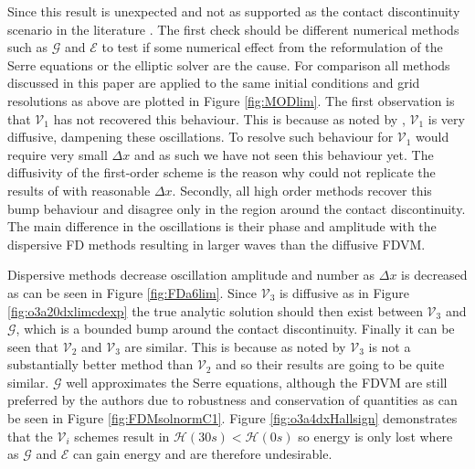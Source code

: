 \documentclass[SingleSpace,12pt,Journal]{Serre_ASCE}
\begin{document}
Since this result is unexpected and not as supported as the contact discontinuity scenario in the literature \cite{El-etal-2006,Gurevich-Meshcherkin-1984-1277}. The first check should be different numerical methods such as $\mathcal{G}$ and $\mathcal{E}$ to test if some numerical effect from the reformulation of the Serre equations or the elliptic solver are the cause. For comparison all methods discussed in this paper are applied to the same initial conditions and grid resolutions as above are plotted in Figure \ref{fig:MODlim}. The first observation is that $\mathcal{V}_1$ has not recovered this behaviour. This is because as noted by , $\mathcal{V}_1$ is very diffusive, dampening these oscillations. To resolve such behaviour for $\mathcal{V}_1$ would require very small $\Delta x$ and as such we have not seen this behaviour yet. The diffusivity of the first-order scheme is the reason why  could not replicate the results of  with reasonable $\Delta x$. Secondly, all high order methods recover this bump behaviour and disagree only in the region around the contact discontinuity. The main difference in the oscillations is their phase and amplitude with the dispersive FD methods resulting in larger waves than the diffusive FDVM. 

Dispersive methods decrease oscillation amplitude and number as $\Delta x$ is decreased as can be seen in Figure \ref{fig:FDa6lim}. Since $\mathcal{V}_3$ is diffusive as in Figure \ref{fig:o3a20dxlimcdexp} the true analytic solution should then exist between $\mathcal{V}_3$ and $\mathcal{G}$, which is a bounded bump around the contact discontinuity. Finally it can be seen that $\mathcal{V}_2$ and $\mathcal{V}_3$ are similar. This is because as noted by  $\mathcal{V}_3$ is not a substantially better method than $\mathcal{V}_2$ and so their results are going to be quite similar. $\mathcal{G}$ well approximates the Serre equations, although the FDVM are still preferred by the authors due to robustness and conservation of quantities as can be seen in Figure \ref{fig:FDMsolnormC1}. Figure \ref{fig:o3a4dxHallsign} demonstrates that the $\mathcal{V}_i$ schemes result in $\mathcal{H}(30s) < \mathcal{H}(0s)$ so energy is only lost where as $\mathcal{G}$ and $\mathcal{E}$ can gain energy and are therefore undesirable.
\end{document}
